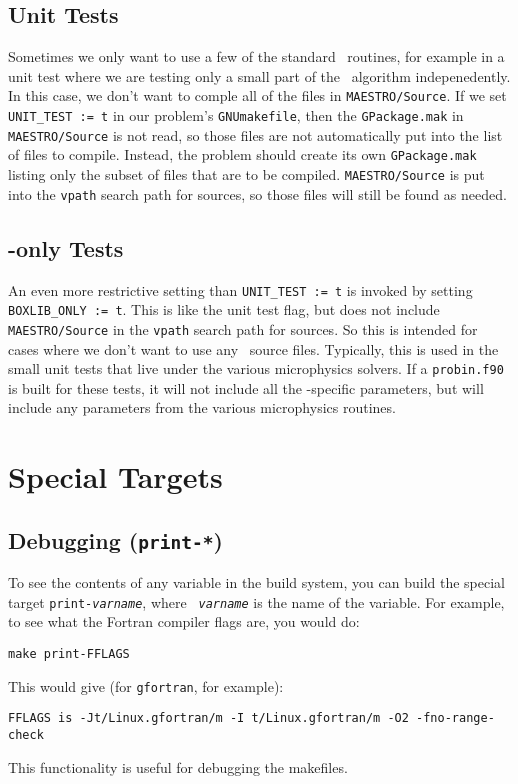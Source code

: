 \subsection{Unit Tests}

Sometimes we only want to use a few of the standard \maestro\
routines, for example in a unit test where we are testing only a small
part of the \maestro\ algorithm indepenedently.  In this case, we
don't want to comple all of the files in {\tt MAESTRO/Source}.  If we
set {\tt UNIT\_TEST := t} in our problem's {\tt GNUmakefile}, then the
{\tt GPackage.mak} in {\tt MAESTRO/Source} is not read, so those files
are not automatically put into the list of files to compile.  Instead,
the problem should create its own {\tt GPackage.mak} listing only the
subset of files that are to be compiled.  {\tt MAESTRO/Source} is put
into the {\tt vpath} search path for sources, so those files will
still be found as needed.


\subsection{\boxlib-only Tests}

An even more restrictive setting than {\tt UNIT\_TEST := t} is invoked
by setting {\tt BOXLIB\_ONLY := t}.  This is like the unit test flag,
but does not include {\tt MAESTRO/Source} in the {\tt vpath} search
path for sources.  So this is intended for cases where we don't want
to use any \maestro\ source files.  Typically, this is used in the
small unit tests that live under the various microphysics solvers.  If
a {\tt probin.f90} is built for these tests, it will not include all
the \maestro-specific parameters, but will include any parameters from
the various microphysics routines.


\section{Special Targets}

\subsection{Debugging ({\tt print-*})}

To see the contents of any variable in the build system, you can build
the special target {\tt print-{\em varname}}, where {\tt {\em
varname}} is the name of the variable.  For example, to see what the
Fortran compiler flags are, you would do:
\begin{verbatim}
make print-FFLAGS
\end{verbatim}
This would give (for {\tt gfortran}, for example):
\begin{verbatim}
FFLAGS is -Jt/Linux.gfortran/m -I t/Linux.gfortran/m -O2 -fno-range-check
\end{verbatim}
This functionality is useful for debugging the makefiles.


